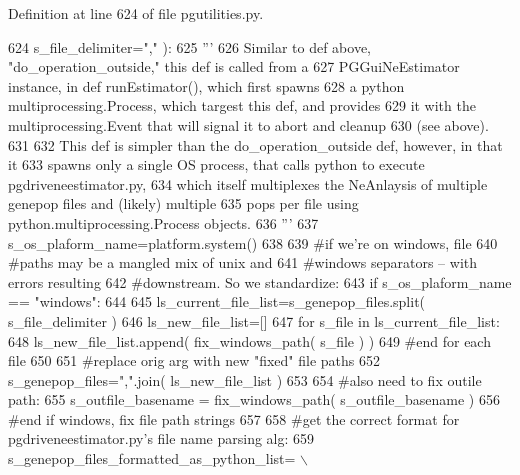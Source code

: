 Definition at line 624 of file pgutilities.\+py.


\begin{DoxyCode}
624                                         s\_file\_delimiter=\textcolor{stringliteral}{","} ):
625     \textcolor{stringliteral}{'''}
626 \textcolor{stringliteral}{    Similar to def above, "do\_operation\_outside," this def is called from a}
627 \textcolor{stringliteral}{    PGGuiNeEstimator instance, in def runEstimator(), which first spawns}
628 \textcolor{stringliteral}{    a python multiprocessing.Process, which targest this def, and provides}
629 \textcolor{stringliteral}{    it with the multiprocessing.Event that will signal it to abort and cleanup}
630 \textcolor{stringliteral}{    (see above).}
631 \textcolor{stringliteral}{}
632 \textcolor{stringliteral}{    This def is simpler than the do\_operation\_outside def, however, in that it}
633 \textcolor{stringliteral}{    spawns only a single OS process, that calls python to execute pgdriveneestimator.py,}
634 \textcolor{stringliteral}{    which itself multiplexes the NeAnlaysis of multiple genepop files and (likely) multiple}
635 \textcolor{stringliteral}{    pops per file using python.multiprocessing.Process objects.}
636 \textcolor{stringliteral}{    '''}
637     s\_os\_plaform\_name=platform.system()
638     
639     \textcolor{comment}{#if we're on windows, file}
640     \textcolor{comment}{#paths may be a mangled mix of unix and }
641     \textcolor{comment}{#windows separators -- with errors resulting}
642     \textcolor{comment}{#downstream.  So we standardize:}
643     \textcolor{keywordflow}{if} s\_os\_plaform\_name == \textcolor{stringliteral}{"windows"}:
644 
645         ls\_current\_file\_list=s\_genepop\_files.split( s\_file\_delimiter )
646         ls\_new\_file\_list=[]
647         \textcolor{keywordflow}{for} s\_file \textcolor{keywordflow}{in} ls\_current\_file\_list:
648             ls\_new\_file\_list.append( fix\_windows\_path( s\_file ) )
649         \textcolor{comment}{#end for each file}
650         
651         \textcolor{comment}{#replace orig arg with new "fixed" file paths}
652         s\_genepop\_files=\textcolor{stringliteral}{","}.join( ls\_new\_file\_list )
653 
654         \textcolor{comment}{#also need to fix outile path:}
655         s\_outfile\_basename = fix\_windows\_path( s\_outfile\_basename )
656     \textcolor{comment}{#end if windows, fix file path strings}
657 
658     \textcolor{comment}{#get the correct format for pgdriveneestimator.py's file name parsing alg:}
659     s\_genepop\_files\_formatted\_as\_python\_list= \(\backslash\)

\end{DoxyCode}
